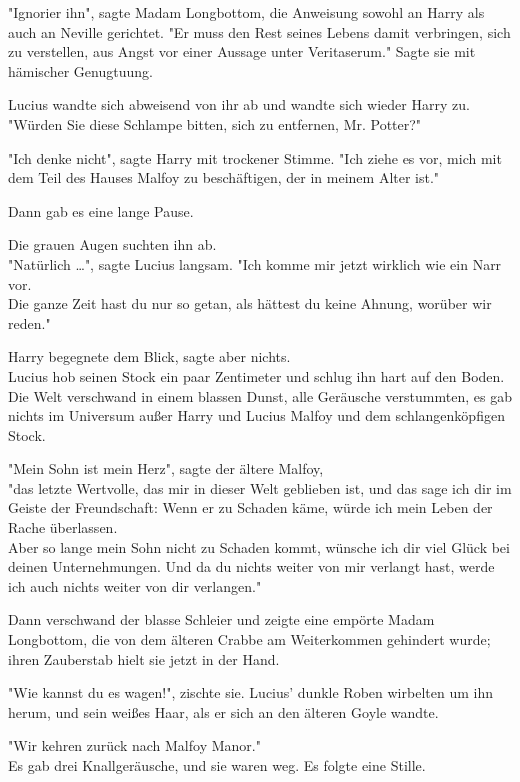 {"Ignorier ihn", sagte Madam Longbottom, die Anweisung sowohl an Harry als auch an Neville gerichtet. "Er muss den Rest seines Lebens damit verbringen, sich zu verstellen, aus Angst vor einer Aussage unter Veritaserum." Sagte sie mit hämischer Genugtuung.

Lucius wandte sich abweisend von ihr ab und wandte sich wieder Harry zu.\\ "Würden Sie diese Schlampe bitten, sich zu entfernen, Mr. Potter?"

"Ich denke nicht", sagte Harry mit trockener Stimme. "Ich ziehe es vor, mich mit dem Teil des Hauses Malfoy zu beschäftigen, der in meinem Alter ist."

Dann gab es eine lange Pause.

Die grauen Augen suchten ihn ab.\\ "Natürlich …", sagte Lucius langsam. "Ich komme mir jetzt wirklich wie ein Narr vor.\\ Die ganze Zeit hast du nur so getan, als hättest du keine Ahnung, worüber wir reden."

Harry begegnete dem Blick, sagte aber nichts.\\ Lucius hob seinen Stock ein paar Zentimeter und schlug ihn hart auf den Boden. Die Welt verschwand in einem blassen Dunst, alle Geräusche verstummten, es gab nichts im Universum außer Harry und Lucius Malfoy und dem schlangenköpfigen Stock.

"Mein Sohn ist mein Herz", sagte der ältere Malfoy,\\ "das letzte Wertvolle, das mir in dieser Welt geblieben ist, und das sage ich dir im Geiste der Freundschaft: Wenn er zu Schaden käme, würde ich mein Leben der Rache überlassen.\\ Aber so lange mein Sohn nicht zu Schaden kommt, wünsche ich dir viel Glück bei deinen Unternehmungen. Und da du nichts weiter von mir verlangt hast, werde ich auch nichts weiter von dir verlangen."

Dann verschwand der blasse Schleier und zeigte eine empörte Madam Longbottom, die von dem älteren Crabbe am Weiterkommen gehindert wurde; ihren Zauberstab hielt sie jetzt in der Hand.

"Wie kannst du es wagen!", zischte sie. Lucius' dunkle Roben wirbelten um ihn herum, und sein weißes Haar, als er sich an den älteren Goyle wandte.

"Wir kehren zurück nach Malfoy Manor."\\ Es gab drei Knallgeräusche, und sie waren weg. Es folgte eine Stille.

}

